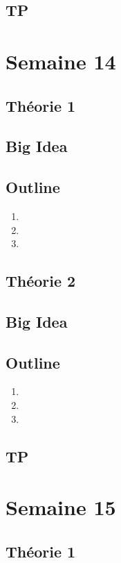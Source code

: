 \documentclass{article}
\begin{document}
\subsection{TP}

\pagebreak
\section{Semaine 14}
\subsection{Théorie 1}
\subsection*{Big Idea}
\subsection*{Outline}
\begin{enumerate}
    \item
    \item
    \item
\end{enumerate}
\subsection{Théorie 2}
\subsection*{Big Idea}
\subsection*{Outline}
\begin{enumerate}
    \item
    \item
    \item
\end{enumerate}
\subsection{TP}

\pagebreak
\section{Semaine 15}
\subsection{Théorie 1}
\end{document}
